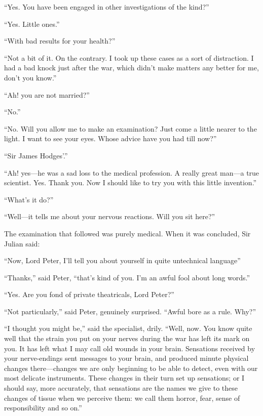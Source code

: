 \enquote{Yes. You have been engaged in other investigations of the kind?}

\enquote{Yes. Little ones.}

\enquote{With bad results for your health?}

\enquote{Not a bit of it. On the contrary. I took up these cases as a sort of distraction. I had a bad knock just after the war, which didn’t make matters any better for me, don’t you know.}

\enquote{Ah! you are not married?}

\enquote{No.}

\enquote{No. Will you allow me to make an examination? Just come a little nearer to the light. I want to see your eyes. Whose advice have you had till now?}

\enquote{Sir James Hodges’.}

\enquote{Ah! yes\allowbreak---\allowbreak he was a sad loss to the medical profession. A really great man\allowbreak---\allowbreak a true scientist. Yes. Thank you. Now I should like to try you with this little invention.}

\enquote{What’s it do?}

\enquote{Well\allowbreak---\allowbreak it tells me about your nervous reactions. Will you sit here?}

The examination that followed was purely medical. When it was concluded, Sir Julian said:

\enquote{Now, Lord Peter, I’ll tell you about yourself in quite untechnical language\longdash}

\enquote{Thanks,} said Peter, \enquote{that’s kind of you. I’m an awful fool about long words.}

\enquote{Yes. Are you fond of private theatricals, Lord Peter?}

\enquote{Not particularly,} said Peter, genuinely surprised. \enquote{Awful bore as a rule. Why?}

\enquote{I thought you might be,} said the specialist, drily. \enquote{Well, now. You know quite well that the strain you put on your nerves during the war has left its mark on you. It has left what I may call old wounds in your brain. Sensations received by your nerve-endings sent messages to your brain, and produced minute physical changes there\allowbreak---\allowbreak changes we are only beginning to be able to detect, even with our most delicate instruments. These changes in their turn set up sensations; or I should say, more accurately, that sensations are the names we give to these changes of tissue when we perceive them: we call them horror, fear, sense of responsibility and so on.}

